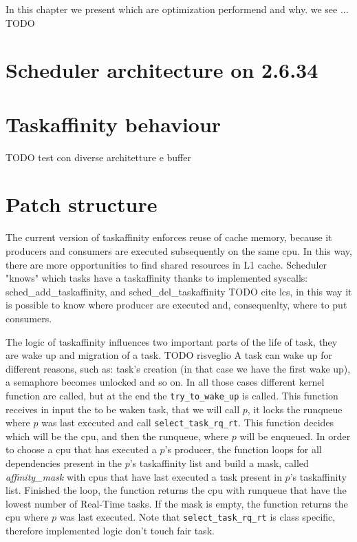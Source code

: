 In this chapter we present which are optimization performend and why. we see ... TODO 

\section{Scheduler architecture on 2.6.34}


\section{Taskaffinity behaviour}

TODO test con diverse architetture e buffer

\section{Patch structure}

The current version of taskaffinity enforces reuse of cache memory, because it producers and consumers are executed subsequently on the same cpu. In this
way, there are more opportunities to find shared resources in L1 cache. Scheduler "knows" which tasks have a taskaffinity thanks to implemented syscalls:
sched\_add\_taskaffinity, and sched\_del\_taskaffinity TODO cite lcs, in this way it is possible to know where producer are executed and, consequenlty, 
where to put consumers.

The logic of taskaffinity influences two important parts of the life of task, they are wake up and migration of a task. TODO risveglio
A task can wake up for different reasons, such as: task's creation (in that case we have the first wake up), a semaphore becomes unlocked and so on.
In all those cases different kernel function are called, but at the end the \texttt{try\_to\_wake\_up} is called. This function receives in input the
to be waken task, that we will call $p$, it locks the runqueue where $p$ was last executed and call \texttt{select\_task\_rq\_rt}. This function decides
which will be the cpu, and then the runqueue, where $p$ will be enqueued. In order to choose a cpu that has executed a $p$'s producer, the function loops
for all dependencies present in the $p$'s taskaffinity list and build a mask, called \textit{affinity\_mask} with cpus that have last executed a task 
present in $p$'s taskaffinity list. Finished the loop, the function returns the cpu with runqueue that have the lowest number of Real-Time tasks. If the 
mask is empty, the function returns the cpu where $p$ was last executed. Note that \texttt{select\_task\_rq\_rt} is class specific, therefore implemented 
logic don't touch fair task.


